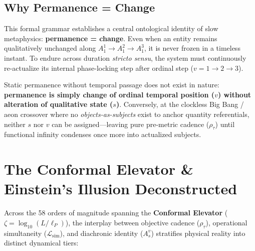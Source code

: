 \documentclass[11pt,a4paper]{article}
\begin{document}
\subsection{Why Permanence = Change}
This formal grammar establishes a central ontological identity of slow metaphysics: \textbf{permanence = change}. Even when an entity remains qualitatively unchanged along $A_1^1 \to A_1^2 \to A_1^3$, it is never frozen in a timeless instant. To endure across duration \emph{stricto sensu}, the system must continuously re-actualize its internal phase-locking step after ordinal step ($v = 1 \to 2 \to 3$).

Static permanence without temporal passage does not exist in nature: \textbf{permanence is simply change of ordinal temporal position ($v$) without alteration of qualitative state ($s$)}. Conversely, at the clockless Big Bang / aeon crossover where no \emph{objects-as-subjects} exist to anchor quantity referentials, neither $s$ nor $v$ can be assigned---leaving pure pre-metric cadence ($\rho_\tau$) until functional infinity condenses once more into actualized subjects.

\section{The Conformal Elevator \& Einstein's Illusion Deconstructed}

Across the 58 orders of magnitude spanning the \textbf{Conformal Elevator} ($\zeta = \log_{10}(L / \ell_P)$), the interplay between objective cadence ($\rho_\tau$), operational simultaneity ($\mathcal{L}_{\mathrm{sim}}$), and diachronic identity ($A_s^v$) stratifies physical reality into distinct dynamical tiers:
\end{document}
